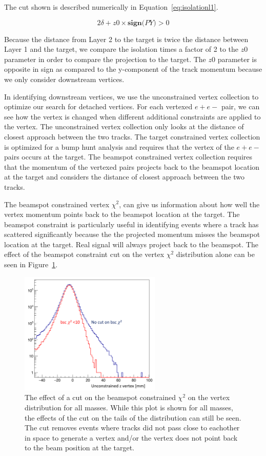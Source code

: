 The cut shown is described numerically in Equation~\eqref{eq:isolationl1}.

\begin{equation}
\label{eq:isolationl1}
2\delta+z0\times\textbf{sign($PY$)}>0
\end{equation}
 
Because the distance from Layer 2 to the target is twice the distance between Layer 1 and the target, we compare the isolation times a factor of 2 to the $z0$ parameter in order to compare the projection to the target. The $z0$ parameter is opposite in sign as compared to the y-component of the track momentum because we only consider downstream vertices. 


\indent In identifying downstream vertices, we use the unconstrained vertex collection to optimize our search for detached vertices. For each vertexed $e+e-$ pair, we can see how the vertex is changed when different additional constraints are applied to the vertex. The unconstrained vertex collection only looks at the distance of closest approach between the two tracks. The target constrained vertex collection is optimized for a bump hunt analysis and requires that the vertex of the $e+e-$ pairs occurs at the target. The beamspot constrained vertex collection requires that the momentum of the vertexed pairs projects back to the beamspot location at the target and considers the distance of closest approach between the two tracks. 

The beamspot constrained vertex $\chi^2$, can give us information about how well the vertex momentum points back to the beamspot location at the target. The beamspot constraint is particularly useful in identifying events where a track has scattered significantly because the the projected momentum misses the beamspot location at the target. Real signal will always project back to the beamspot. The effect of the beamspot constraint cut on the vertex  $\chi^2$ distribution alone can be seen in Figure~\ref{fig:bsccut}.

\begin{figure}[H]
  \centering
      \includegraphics[width=0.6\textwidth]{plots/bscCut.png}
  \caption{The effect of a cut on the beamspot constrained $\chi^2$ on the vertex distribution for all masses. While this plot is shown for all masses, the effects of the cut on the tails of the distribution can still be seen. The cut removes events where tracks did not pass close to eachother in space to generate a vertex and/or the vertex does not point back to the beam position at the target.}
  \label{fig:bsccut}
\end{figure} 

